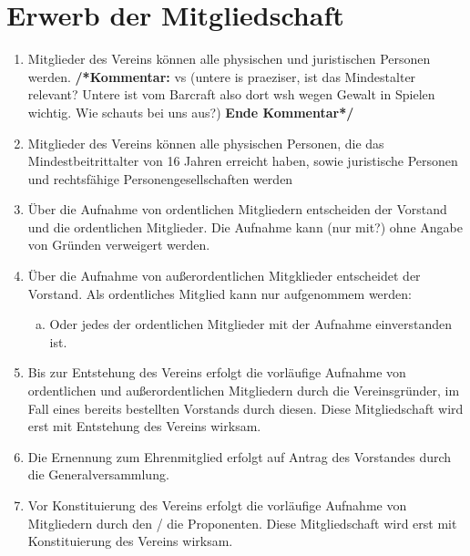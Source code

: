 \documentclass[a4paper,12pt]{article}
\newcommand{\comment}[1]{{\newline \bf /*Kommentar:} #1 {\bf Ende Kommentar*/}}
\begin{document}
\section{Erwerb der Mitgliedschaft} %
\begin{enumerate}
\item Mitglieder des Vereins können alle physischen und juristischen Personen werden.
\comment{vs (untere is praeziser, ist das Mindestalter relevant? Untere ist vom Barcraft also dort wsh wegen Gewalt in Spielen wichtig. Wie schauts bei uns aus?)}
\item Mitglieder des Vereins können alle physischen Personen, die das Mindestbeitrittalter von 16 Jahren erreicht haben, sowie juristische Personen und rechtsfähige Personengesellschaften werden
\item Über die Aufnahme von ordentlichen Mitgliedern entscheiden der Vorstand und die ordentlichen Mitglieder. Die Aufnahme kann (nur mit?) ohne Angabe von Gründen verweigert werden. \item Über die Aufnahme von außerordentlichen Mitgklieder entscheidet der Vorstand. Als ordentliches Mitglied kann nur aufgenommem werden:
	\begin{enumerate}[(a)]
	\item Oder jedes der ordentlichen Mitglieder mit der Aufnahme einverstanden ist.
	\end{enumerate}
\item Bis zur Entstehung des Vereins erfolgt die vorläufige Aufnahme von ordentlichen und außerordentlichen Mitgliedern durch die Vereinsgründer, im Fall eines bereits bestellten Vorstands durch diesen. Diese Mitgliedschaft wird erst mit Entstehung des Vereins wirksam.
\item  Die Ernennung zum Ehrenmitglied erfolgt auf Antrag des Vorstandes durch die Generalversammlung.
\item Vor Konstituierung des Vereins erfolgt die vorläufige Aufnahme von Mitgliedern durch den / die Proponenten. Diese Mitgliedschaft wird erst mit Konstituierung des Vereins wirksam.
\end{enumerate}
\end{document}
